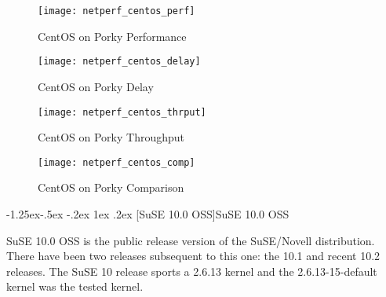 \documentclass[letterpaper,final,notitlepage,twocolumn,10pt,twoside]{article}
\makeatletter
\renewcommand\subsubsection{\@startsection{subsubsection}{3}{\z@}%
                                     {-1.25ex\@plus -.5ex \@minus -.2ex}%
                                     {1ex \@plus .2ex}%
                                     {\normalfont\normalsize\bfseries}}
\makeatother
\begin{document}
\begin{figure}[p]
\center\texttt{[image: netperf\_centos\_perf]}
\caption[CentOS on Porky Performance]{CentOS on Porky Performance}
\label{figure:centosperf}
\end{figure}

\begin{figure}[p]
\center\texttt{[image: netperf\_centos\_delay]}
\caption[CentOS on Porky Delay]{CentOS on Porky Delay}
\label{figure:centosdly}
\end{figure}

\begin{figure}[p]
\center\texttt{[image: netperf\_centos\_thrput]}
\caption[CentOS on Porky Throughput]{CentOS on Porky Throughput}
\label{figure:centosthrput}
\end{figure}

\begin{figure}[p]
\center\texttt{[image: netperf\_centos\_comp]}
\caption[CentOS on Porky Comparison]{CentOS on Porky Comparison}
\label{figure:centoscomp}
\end{figure}

\subsubsection[SuSE 10.0 OSS]{SuSE 10.0 OSS}

SuSE 10.0 OSS is the public release version of the SuSE/Novell distribution.  There have been two
releases subsequent to this one: the 10.1 and recent 10.2 releases.  The SuSE 10 release sports a
2.6.13 kernel and the 2.6.13-15-default kernel was the tested kernel.
\end{document}
